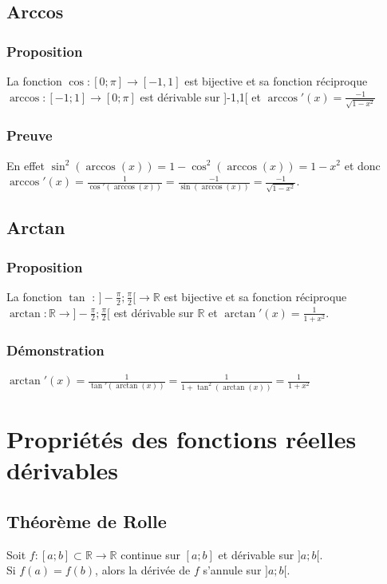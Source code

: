 \documentclass[a4paper,10pt]{book} %
\newcommand{\R}{\mathbb{R}}
\begin{document}
\subsection{Arccos}
\subsubsection{Proposition}
La fonction $\cos : [0;\pi]\rightarrow [-1,1]$ est bijective et sa fonction réciproque $\arccos : [-1;1] \rightarrow [0;\pi]$ est dérivable sur ]-1,1[ et $\arccos'(x)=\frac{-1}{\sqrt{1-x^2}}$

\subsubsection{Preuve}
En effet $\sin^2(\arccos(x))=1-\cos^2(\arccos(x))=1-x^2$ et donc \\
$\arccos'(x)=\frac{1}{\cos'(\arccos(x))}=\frac{-1}{\sin(\arccos(x))}=\frac{-1}{\sqrt{1-x^2}}$.

\subsection{Arctan}
\subsubsection{Proposition}
La fonction $\tan$ : $]-\frac{\pi}{2};\frac{\pi}{2}[\rightarrow \R$ est bijective et sa fonction réciproque $\arctan : \R \rightarrow ]-\frac{\pi}{2};\frac{\pi}{2}[$ est dérivable sur $\R$ et $\arctan'(x)=\frac{1}{1+x^2}$.

\subsubsection{Démonstration}
$\arctan'(x)=\frac{1}{\tan'(\arctan(x))}=\frac{1}{1+\tan^2(\arctan(x))}=\frac{1}{1+x^2}$

\section{Propriétés des fonctions réelles dérivables}
\subsection{Théorème de Rolle}
Soit $f : [a;b]\subset \R \rightarrow \R$ continue sur $[a;b]$ et dérivable sur $]a;b[$.\\
Si $f(a)=f(b)$, alors la dérivée de $f$ s'annule sur $]a;b[$.
\end{document}
